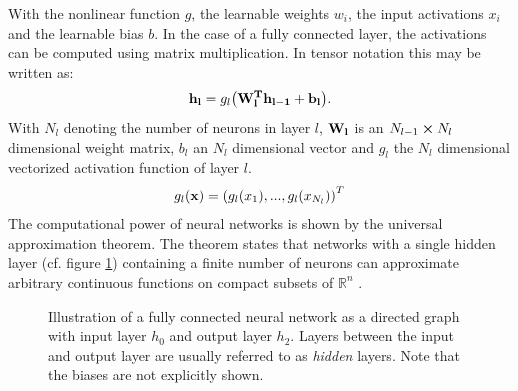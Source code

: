 With the nonlinear function $g$, the learnable weights $w_i$, the input activations $x_i$ and the learnable bias $b$. In the case of a fully connected layer, the activations can be computed using matrix multiplication. In tensor notation this may be written as:
\begin{align}
    \vb{h_l} = g_l\qty(\vb{W^T_l\vb{h_{l-1}}}+\vb{b_l}).
\end{align}
With $N_l$ denoting the number of neurons in layer $l$, $\vb{W_l}$ is an $N_{l-1}\cp N_l$ dimensional weight matrix, $b_l$ an $N_l$ dimensional vector and $g_l$ the $N_l$ dimensional vectorized activation function of layer $l$.
\begin{align}
    g_l(\vb{x}) = \qty(g_l(x_1),...,g_l(x_{N_l}))^T
\end{align}
The computational power of neural networks is shown by the universal approximation theorem. The theorem states that networks with a single hidden layer (cf. figure \ref{fig:fully-connected}) containing a finite number of neurons can approximate arbitrary continuous functions on compact subsets of $\mathbb{R}^n$ \cite{univ-approx-1,univ-approx-2}.
\begin{figure}
    \centering
{}
\caption[Illustration of fully connected layers]{Illustration of a fully connected neural network as a directed graph with input layer $h_0$ and output layer $h_2$. Layers between the input and output layer are usually referred to as \emph{hidden} layers. Note that the biases are not explicitly shown.}\label{fig:fully-connected}
\end{figure}\noindent
